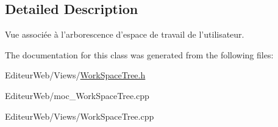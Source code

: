 \subsection{Detailed Description}
Vue associée à l'arborescence d'espace de travail de l'utilisateur. 

The documentation for this class was generated from the following files:\begin{DoxyCompactItemize}
\item 
EditeurWeb/Views/\hyperlink{_work_space_tree_8h}{WorkSpaceTree.h}\item 
EditeurWeb/moc\_\-WorkSpaceTree.cpp\item 
EditeurWeb/Views/WorkSpaceTree.cpp\end{DoxyCompactItemize}
